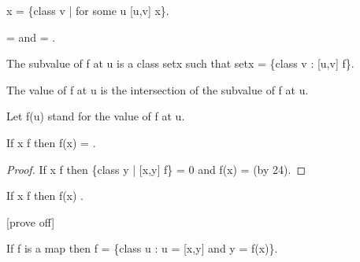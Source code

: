 \documentclass[a4paper,draft]{amsproc}
\begin{document}
\begin{forthel}
\begin{definition}[66]
\range x = \{class v | for some u [u,v] \in x\}.
\end{definition}

\begin{theorem}[67]
\domain {} =  and \range {} = .
\end{theorem}

\begin{definition}
The subvalue of f at u is a class setx such that setx = \{class v : [u,v] \in f\}.
\end{definition}

\begin{signature}[68]
The value of f at u is the intersection of the subvalue of f at u.
\end{signature}
Let f(u) stand for the value of f at u.


\begin{theorem}[69a]
If x \notin \domain f then f(x) = .
\end{theorem}
\begin{proof}
If x \notin \domain f 
then \{class y | [x,y] \in f\} = 0 and f(x) =  (by 24).
\end{proof}

\begin{theorem}[69b]
If x \in \domain f then f(x) \in {}.
\end{theorem}

	[prove off]
\begin{theorem}[70]
If f is a map then f = \{class u : u = [x,y] and y = f(x)\}.
\end{theorem}


\end{forthel}
\end{document}
